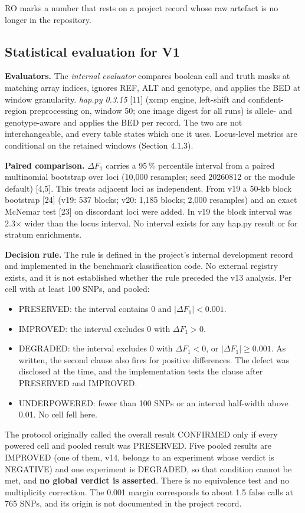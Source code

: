\documentclass[11pt,a4paper]{article}
\makeatletter
\newcommand{\needspace}[1]{\par\ifdim\pagegoal=\maxdimen\else\dimen@=\pagegoal\advance\dimen@-\pagetotal\ifdim\dimen@<#1\relax\newpage\fi\fi}
\makeatother
\begin{document}
RO marks a number that rests on a project record whose raw artefact is no longer in the repository.

\needspace{6\baselineskip}
\subsection{\texorpdfstring{Statistical evaluation for V1}{Statistical evaluation for V1}}
\textbf{Evaluators.} The \emph{internal evaluator} compares boolean call and truth masks at matching array indices, ignores REF, ALT and genotype, and applies the BED at window granularity. \emph{hap.py 0.3.15} [11] (xcmp engine, left-shift and confident-region preprocessing on, window 50; one image digest for all runs) is allele- and genotype-aware and applies the BED per record. The two are not interchangeable, and every table states which one it uses. Locus-level metrics are conditional on the retained windows (Section 4.1.3).

\textbf{Paired comparison.} $\Delta F_1$ carries a 95\,\% percentile interval from a paired multinomial bootstrap over loci (10,000 resamples; seed 20260812 or the module default) [4,5]. This treats adjacent loci as independent. From v19 a 50-kb block bootstrap [24] (v19: 537 blocks; v20: 1,185 blocks; 2,000 resamples) and an exact McNemar test [23] on discordant loci were added. In v19 the block interval was 2.3$\times$ wider than the locus interval. No interval exists for any hap.py result or for stratum enrichments.

\textbf{Decision rule.} The rule is defined in the project's internal development record and implemented in the benchmark classification code. No external registry exists, and it is not established whether the rule preceded the v13 analysis. Per cell with at least 100 SNPs, and pooled:

\begin{itemize}[leftmargin=1.6em,itemsep=2pt,topsep=3pt]
\item PRESERVED: the interval contains 0 and $|\Delta F_1| < 0.001$.
\item IMPROVED: the interval excludes 0 with $\Delta F_1 > 0$.
\item DEGRADED: the interval excludes 0 with $\Delta F_1 < 0$, or $|\Delta F_1| \ge 0.001$. As written, the second clause also fires for positive differences. The defect was disclosed at the time, and the implementation tests the clause after PRESERVED and IMPROVED.
\item UNDERPOWERED: fewer than 100 SNPs or an interval half-width above 0.01. No cell fell here.
\end{itemize}
The protocol originally called the overall result CONFIRMED only if every powered cell and pooled result was PRESERVED. Five pooled results are IMPROVED (one of them, v14, belongs to an experiment whose verdict is NEGATIVE) and one experiment is DEGRADED, so that condition cannot be met, and \textbf{no global verdict is asserted}. There is no equivalence test and no multiplicity correction. The 0.001 margin corresponds to about 1.5 false calls at 765 SNPs, and its origin is not documented in the project record.
\end{document}
